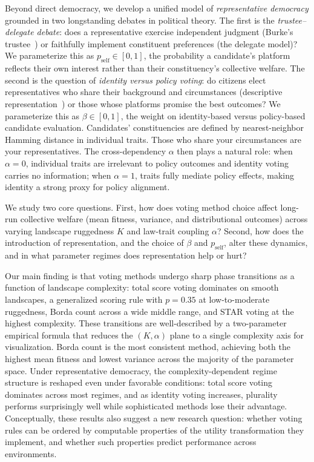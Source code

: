 Beyond direct democracy, we develop a unified model of \emph{representative
democracy} grounded in two longstanding debates in political theory. The first is
the \emph{trustee--delegate debate}: does a representative exercise independent
judgment (Burke's trustee~\citep{burke1774bristol}) or faithfully implement
constituent preferences (the delegate model)? We parameterize this as
$p_{\mathrm{self}} \in [0,1]$, the probability a candidate's platform reflects
their own interest rather than their constituency's collective welfare. The second
is the question of \emph{identity versus policy voting}: do citizens elect
representatives who share their background and circumstances (descriptive
representation~\citep{mansbridge1999should}) or those whose platforms promise the
best outcomes? We parameterize this as $\beta \in [0,1]$, the weight on
identity-based versus policy-based candidate evaluation. Candidates' constituencies
are defined by nearest-neighbor Hamming distance in individual traits. Those who
share your circumstances are your representatives. The cross-dependency $\alpha$
then plays a natural role: when $\alpha=0$, individual traits are irrelevant to
policy outcomes and identity voting carries no information; when $\alpha=1$,
traits fully mediate policy effects, making identity a strong proxy for policy
alignment.

We study two core questions. First, how does voting method choice affect long-run
collective welfare (mean fitness, variance, and distributional outcomes) across
varying landscape ruggedness $K$ and law-trait coupling $\alpha$? Second, how
does the introduction of representation, and the choice of $\beta$ and
$p_{\mathrm{self}}$, alter these dynamics, and in what parameter regimes does
representation help or hurt?

Our main finding is that voting methods undergo sharp phase transitions as a
function of landscape complexity: total score voting dominates on smooth
landscapes, a generalized scoring rule with $p=0.35$ at low-to-moderate
ruggedness, Borda count across a wide middle range, and STAR voting at the
highest complexity. These transitions are
well-described by a two-parameter empirical formula that reduces the $(K, \alpha)$
plane to a single complexity axis for visualization. Borda count is the most consistent method,
achieving both the highest mean fitness and lowest variance across the majority
of the parameter space. Under representative democracy, the complexity-dependent
regime structure is reshaped even under favorable conditions: total score voting
dominates across most regimes, and as identity voting increases, plurality
performs surprisingly well while sophisticated methods lose their advantage.
Conceptually, these results also suggest a
new research question: whether voting rules can be ordered by computable
properties of the utility transformation they implement, and whether such
properties predict performance across environments.


